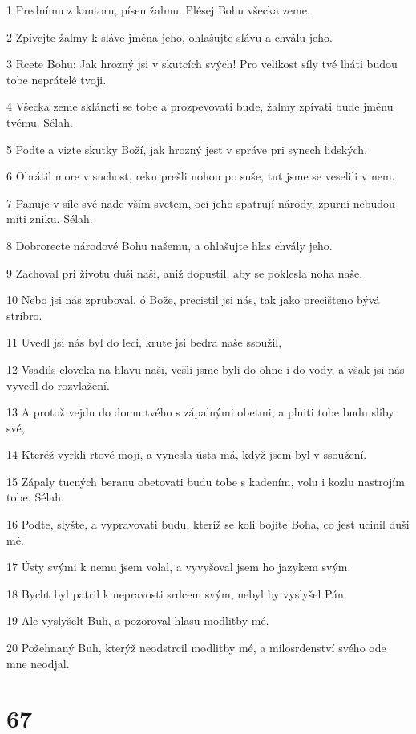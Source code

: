 \par 1 Prednímu z kantoru, písen žalmu. Plésej Bohu všecka zeme.
\par 2 Zpívejte žalmy k sláve jména jeho, ohlašujte slávu a chválu jeho.
\par 3 Rcete Bohu: Jak hrozný jsi v skutcích svých! Pro velikost síly tvé lháti budou tobe neprátelé tvoji.
\par 4 Všecka zeme skláneti se tobe a prozpevovati bude, žalmy zpívati bude jménu tvému. Sélah.
\par 5 Podte a vizte skutky Boží, jak hrozný jest v správe pri synech lidských.
\par 6 Obrátil more v suchost, reku prešli nohou po suše, tut jsme se veselili v nem.
\par 7 Panuje v síle své nade vším svetem, oci jeho spatrují národy, zpurní nebudou míti zniku. Sélah.
\par 8 Dobrorecte národové Bohu našemu, a ohlašujte hlas chvály jeho.
\par 9 Zachoval pri životu duši naši, aniž dopustil, aby se poklesla noha naše.
\par 10 Nebo jsi nás zpruboval, ó Bože, precistil jsi nás, tak jako precišteno bývá stríbro.
\par 11 Uvedl jsi nás byl do leci, krute jsi bedra naše ssoužil,
\par 12 Vsadils cloveka na hlavu naši, vešli jsme byli do ohne i do vody, a však jsi nás vyvedl do rozvlažení.
\par 13 A protož vejdu do domu tvého s zápalnými obetmi, a plniti tobe budu sliby své,
\par 14 Kteréž vyrkli rtové moji, a vynesla ústa má, když jsem byl v ssoužení.
\par 15 Zápaly tucných beranu obetovati budu tobe s kadením, volu i kozlu nastrojím tobe. Sélah.
\par 16 Podte, slyšte, a vypravovati budu, kteríž se koli bojíte Boha, co jest ucinil duši mé.
\par 17 Ústy svými k nemu jsem volal, a vyvyšoval jsem ho jazykem svým.
\par 18 Bycht byl patril k nepravosti srdcem svým, nebyl by vyslyšel Pán.
\par 19 Ale vyslyšelt Buh, a pozoroval hlasu modlitby mé.
\par 20 Požehnaný Buh, kterýž neodstrcil modlitby mé, a milosrdenství svého ode mne neodjal.

\chapter{67}

